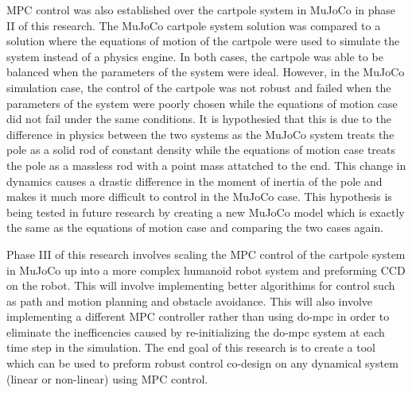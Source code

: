 \documentclass{./springer/svjour3}
\begin{document}
MPC control was also established over the cartpole system in MuJoCo in phase II of this research. The MuJoCo cartpole system solution was compared to a solution
where the equations of motion of the cartpole were used to simulate the system instead of a physics engine. In both cases, the cartpole was able to be balanced when the 
parameters of the system were ideal. However, in the MuJoCo simulation case, the control of the cartpole was not robust and failed when the parameters of the system were
poorly chosen while the equations of motion case did not fail under the same conditions. It is hypothesied that this is due to the difference in physics 
between the two systems as the MuJoCo system treats the pole as a solid rod of constant density while the equations of motion case treats the pole as a massless rod with a point mass 
attatched to the end. This change in dynamics causes a drastic difference in the moment of inertia of the pole and makes it much more difficult to control in the 
MuJoCo case. This hypothesis is being tested in future research by creating a new MuJoCo model which is exactly the same as the equations of motion case 
and comparing the two cases again.

Phase III of this research involves scaling the MPC control of the cartpole system in MuJoCo up into a more complex humanoid robot system and preforming CCD on the robot. 
This will involve implementing better algorithims for control such as path and motion planning and obstacle avoidance. This will also involve implementing a different 
MPC controller rather than using do-mpc in order to eliminate the inefficencies caused by re-initializing the do-mpc system at each time step in the simulation. The end 
goal of this research is to create a tool which can be used to preform robust control co-design on any dynamical system (linear or non-linear) using MPC control.
\end{document}

